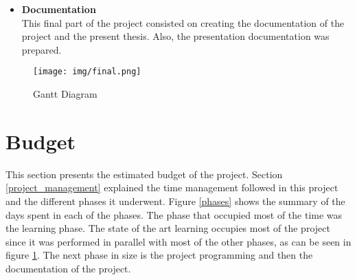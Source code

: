 \begin{appendices}
\begin{itemize}
			 	\item{\textbf{Documentation}}\\
			 	This final part of the project consisted on creating the documentation of the project and the present thesis. Also, the presentation documentation was prepared. 
			 	\\
		 \end{itemize}

		\begin{figure}[H]
			\centering
		    \texttt{[image: img/final.png]}
			\caption[Gantt Diagram]{Gantt Diagram}	
			\label{gantt_diagram}
		\end{figure}

\newpage
	\chapter{Budget}
		This section presents the estimated budget of the project. 
		Section \ref{project_management} explained the time management followed in this project and the different phases it underwent. 
		Figure \ref{phases} shows the summary of the days spent in each of the phases. 
		The phase that occupied most of the time was the learning phase. 
		The state of the art learning occupies most of the project since it was performed in parallel with most of the other phases, as can be seen in figure \ref{gantt_diagram}. 
		The next phase in size is the project programming and then the documentation of the project. 



\end{appendices}
